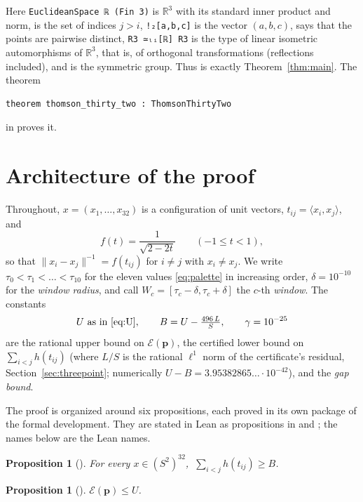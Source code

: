 \documentclass[11pt]{amsart}
\newtheorem{proposition}[theorem]{Proposition}
\theoremstyle{definition}
\theoremstyle{remark}
\newcommand{\R}{\mathbb{R}}
\newcommand{\Sph}{S^{2}}
\newcommand{\ip}[2]{\langle #1,#2\rangle}
\newcommand{\norm}[1]{\lVert #1\rVert}
\newcommand{\E}{\mathcal{E}}
\newcommand{\cand}{\mathbf{p}}
\begin{document}
Here \texttt{EuclideanSpace ℝ (Fin 3)} is $\R^{3}$ with its standard inner product and norm,  is the set of indices $j>i$, \texttt{!₂[a,b,c]} is the vector $(a,b,c)$,  says that the points are pairwise distinct, \texttt{R3 ≃ₗᵢ[ℝ] R3} is the type of linear isometric automorphisms of $\R^{3}$, that is, of orthogonal transformations (reflections included), and  is the symmetric group. Thus  is exactly Theorem~\ref{thm:main}. The theorem
\begin{lstlisting}
theorem thomson_thirty_two : ThomsonThirtyTwo
\end{lstlisting}
in  proves it.

\section{Architecture of the proof}\label{sec:architecture}

Throughout, $x=(x_1,\dots,x_{32})$ is a configuration of unit vectors, $t_{ij}=\ip{x_i}{x_j}$, and
\[
  f(t)=\frac{1}{\sqrt{2-2t}}\qquad(-1\le t<1),
\]
so that $\norm{x_i-x_j}^{-1}=f(t_{ij})$ for $i\ne j$ with $x_i\ne x_j$. We write $\tau_0<\tau_1<\dots<\tau_{10}$ for the eleven values \eqref{eq:palette} in increasing order, $\delta=10^{-10}$ for the \emph{window radius}, and call $W_c=[\tau_c-\delta,\tau_c+\delta]$ the $c$-th \emph{window}. The constants
\[
  U\ \text{as in \eqref{eq:U}},\qquad B=U-\tfrac{496\,L}{S},\qquad \gamma=10^{-25}
\]
are the rational upper bound on $\E(\cand)$, the certified lower bound on $\sum_{i<j}h(t_{ij})$ (where $L/S$ is the rational $\ell^{1}$ norm of the certificate's residual, Section~\ref{sec:threepoint}; numerically $U-B=3.95382865\ldots\cdot10^{-42}$), and the \emph{gap bound}.

The proof is organized around six propositions, each proved in its own package of the formal development. They are stated in Lean as propositions in  and ; the names below are the Lean names.

\begin{proposition}[]\label{prop:pairbound}
For every $x\in(\Sph)^{32}$, $\ \sum_{i<j}h(t_{ij})\ge B$.
\end{proposition}

\begin{proposition}[]\label{prop:candidateupper}
$\E(\cand)\le U$.
\end{proposition}
\end{document}
